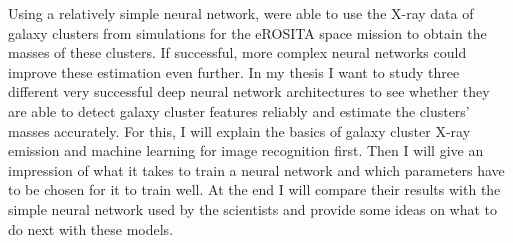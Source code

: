Using a relatively simple neural network, \citet{Krippendorf_2023} were able to use the X-ray data of galaxy clusters from simulations for the eROSITA space mission to obtain the masses of these clusters. If successful, more complex neural networks could improve these estimation even further. In my thesis I want to study three different very successful deep neural network architectures to see whether they are able to detect galaxy cluster features reliably and estimate the clusters' masses accurately. For this, I will explain the basics of galaxy cluster X-ray emission and machine learning for image recognition first. Then I will give an impression of what it takes to train a neural network and which parameters have to be chosen for it to train well. At the end I will compare their results with the simple neural network used by the scientists and provide some ideas on what to do next with these models.